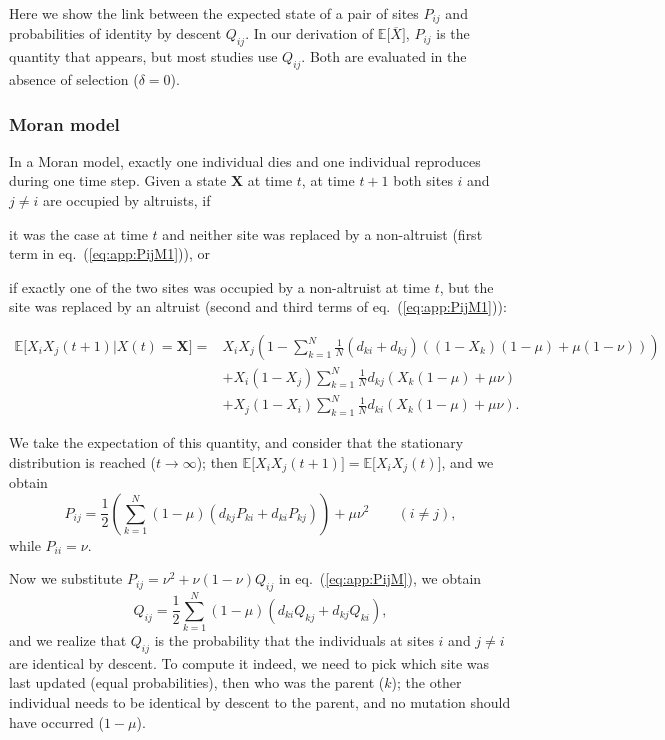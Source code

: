 \documentclass[11pt, letterpaper]{article}
\renewcommand{\eqref}[1]{\textup{{\normalfont eq.~(\ref{#1}}\normalfont)}}
\newcommand{\Esp}[1]{\mathbb{E}\big[ #1\big]}%
\newcommand{\mutbias}{\nu}
\newcommand{\selstr}{\delta}
\begin{document}
Here we show the link between the expected state of a pair of sites $P_{ij}$ and probabilities of identity by descent $Q_{ij}$. In our derivation of $\Esp{\overline{X}}$, $P_{ij}$ is the quantity that appears, but most studies use $Q_{ij}$. Both are evaluated in the absence of selection ($\selstr = 0$). 

\subsubsection{Moran model}
In a Moran model, exactly one individual dies and one individual reproduces during one time step. Given a state $\mathbf{X}$ at time $t$, at time $t+1$ both sites $i$ and $j\neq i$ are occupied by altruists, if \begin{inparaenum}[\it i\rm)]\item it was the case at time $t$ and neither site was replaced by a non-altruist (first term in \eqref{eq:app:PijM1}), or \item if exactly one of the two sites was occupied by a non-altruist at time $t$, but the site was replaced by an altruist (second and third terms of \eqref{eq:app:PijM1}): \end{inparaenum}
%
\begin{align}\label{eq:app:PijM1}
 \Esp{X_iX_j(t+1)|X(t)=\mathbf{X}} = & X_i X_j \left(1 - \sum_{k=1}^N \frac{1}{N} \left( d_{ki} + d_{kj} \right) \left( (1-X_k) (1-\mu) + \mu (1-\mutbias)\right) \right) \nonumber \\
  &+ X_i (1-X_j) \sum_{k=1}^N \frac{1}{N} d_{kj} \left( X_k (1-\mu) + \mu \mutbias \right)  \\
& + X_j (1-X_i) \sum_{k=1}^N \frac{1}{N} d_{ki} \left( X_k (1-\mu) + \mu \mutbias \right). \nonumber
\end{align}

We take the expectation of this quantity, and consider that the stationary distribution is reached ($t\to \infty$); then $\Esp{X_iX_j(t+1)} = \Esp{X_i X_j (t)}$, and we obtain
%
\begin{equation}\label{eq:app:PijM}
P_{ij} = \frac{1}{2} \left(\sum_{k=1}^N (1-\mu) \left( d_{kj} P_{ki} + d_{ki} P_{kj}\right) \right) + \mu \mutbias^2 \qquad (i\neq j ),
\end{equation} 
while $P_{ii}=\mutbias$. 

Now we substitute $P_{ij} = \mutbias^2 + \mutbias (1-\mutbias) Q_{ij}$ in \eqref{eq:app:PijM}, we obtain
\begin{equation}\label{eq:app:QijM}
Q_{ij} = \frac{1}{2} \sum_{k=1}^N (1-\mu) \left( d_{ki} Q_{kj} + d_{kj} Q_{ki}\right),
\end{equation}
and we realize that $Q_{ij}$ is the probability that the individuals at sites $i$ and $j \neq i$ are identical by descent. To compute it indeed, we need to pick which site was last updated (equal probabilities), then who was the parent ($k$); the other individual needs to be identical by descent to the parent, and no mutation should have occurred ($1-\mu$). 
\end{document}
